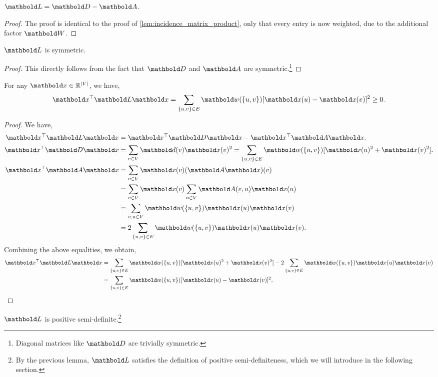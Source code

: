 \begin{lem}
$\mL = \mD - \mA$.
\end{lem}
\begin{proof}
The proof is identical to the proof of \cref{lem:incidence_matrix_product}, only that every entry is now weighted, due to the additional factor $\mW$.
\end{proof}

\begin{cor}
$\mL$ is symmetric.
\end{cor}
\begin{proof}
This directly follows from the fact that $\mD$ and $\mA$ are symmetric.\footnote{Diagonal matrices like $\mD$ are trivially symmetric.}
\end{proof}

\begin{lem}
For any $\vx \in \R^{|\sV|}$, we have, \begin{align}
    \trans{\vx}\mL\vx = \sum_{\{u,v\}\in\sE} \vw(\{u, v\})[\vx(u) - \vx(v)]^2 \geq 0. \label{eq:laplacian_quadratic_form}
\end{align}
\end{lem}
\begin{proof}
We have, \begin{align*}
    \trans{\vx}\mL\vx &= \trans{\vx}\mD\vx - \trans{\vx}\mA\vx. \\
    \trans{\vx}\mD\vx &= \sum_{v \in \sV} \vd(v) \vx(v)^2 = \sum_{\{u,v\}\in\sE} \vw(\{u,v\})[\vx(u)^2 + \vx(v)^2]. \\
    \trans{\vx}\mA\vx &= \sum_{v \in \sV} \vx(v) (\mA\vx)(v) \\
    &= \sum_{v \in \sV} \vx(v) \sum_{u \in \sV} \mA(v,u) \vx(u) \\
    &= \sum_{v,u \in \sV} \vw(\{u,v\})\vx(u)\vx(v) \\
    &= 2 \sum_{\{u,v\}\in\sE} \vw(\{u,v\})\vx(u)\vx(v).
\end{align*} Combining the above equalities, we obtain, \begin{align*}
    \trans{\vx}\mL\vx &= \sum_{\{u,v\}\in\sE} \vw(\{u,v\})[\vx(u)^2 + \vx(v)^2] - 2 \sum_{\{u,v\}\in\sE} \vw(\{u,v\})\vx(u)\vx(v) \\
    &= \sum_{\{u,v\}\in\sE} \vw(\{u,v\})[\vx(u) - \vx(v)]^2. \qedhere
\end{align*}
\end{proof}
\begin{cor}
$\mL$ is positive semi-definite.\footnote{By the previous lemma, $\mL$ satisfies the definition of positive semi-definiteness, which we will introduce in the following section.}
\end{cor}

